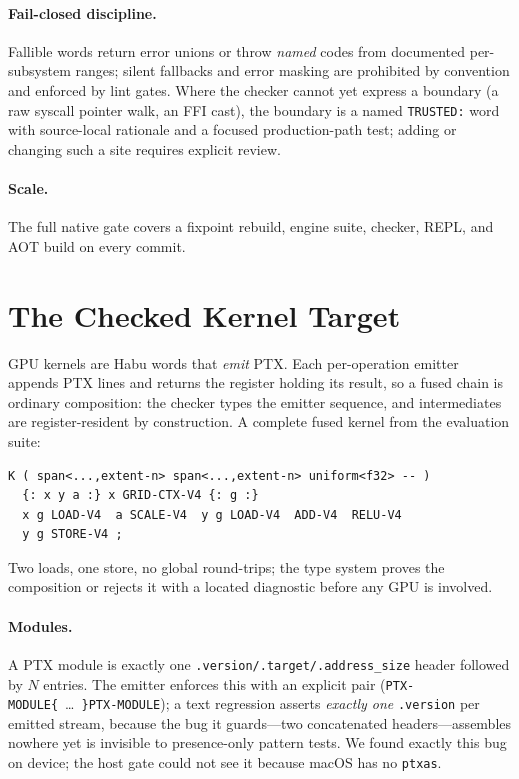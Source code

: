 \documentclass[11pt]{article}
\newcommand{\code}[1]{\texttt{#1}}
\begin{document}
\paragraph{Fail-closed discipline.} Fallible words return error unions or
throw \emph{named} codes from documented per-subsystem ranges; silent
fallbacks and error masking are prohibited by convention and enforced by
lint gates. Where the checker cannot yet express a boundary (a raw
syscall pointer walk, an FFI cast), the boundary is a named
\code{TRUSTED:} word with source-local rationale and a focused
production-path test; adding or changing such a site requires explicit review.

\paragraph{Scale.} The full native gate covers a fixpoint rebuild, engine
suite, checker, REPL, and AOT build on every commit.

\section{The Checked Kernel Target}\label{sec:target}
GPU kernels are Habu words that \emph{emit} PTX. Each per-operation
emitter appends PTX lines and returns the register holding its result, so
a fused chain is ordinary composition: the checker types the emitter
sequence, and intermediates are register-resident by construction. A
complete fused kernel from the evaluation suite:
\begin{verbatim}
K ( span<...,extent-n> span<...,extent-n> uniform<f32> -- )
  {: x y a :} x GRID-CTX-V4 {: g :}
  x g LOAD-V4  a SCALE-V4  y g LOAD-V4  ADD-V4  RELU-V4
  y g STORE-V4 ;
\end{verbatim}
Two loads, one store, no global round-trips; the type system proves the
composition or rejects it with a located diagnostic before any GPU is
involved.

\paragraph{Modules.} A PTX module is exactly one
\code{.version/.target/.address\_size} header followed by $N$ entries.
The emitter enforces this with an explicit pair
(\code{PTX-MODULE\{}~\dots~\code{\}PTX-MODULE}); a text regression
asserts \emph{exactly one} \code{.version} per emitted stream, because
the bug it guards---two concatenated headers---assembles nowhere yet is
invisible to presence-only pattern tests. We found exactly this bug on
device; the host gate could not see it because macOS has no
\code{ptxas}.
\end{document}
